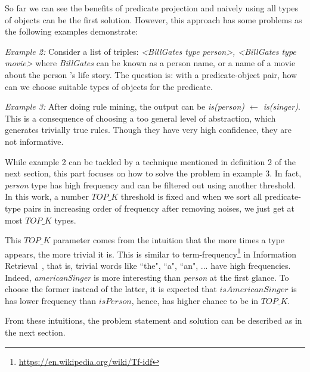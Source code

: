 \documentclass{acm_proc_article-sp}
\begin{document}

So far we can see the benefits of predicate projection and naively using all types of objects can be the first solution. However, this approach has some problems as the following examples demonstrate:

\textit{Example 2:} Consider a list of triples: \textit{<BillGates type person>, <BillGates type movie>} where \textit{BillGates} can be known as a person name, or a name of a movie about the person 's life story. The question is: with a predicate-object pair, how can we choose suitable types of objects for the predicate.

\textit{Example 3:} After doing rule mining, the output can be \textit{is(person) $\leftarrow$ is(singer)}. This is a consequence of choosing a too general level of abstraction, which generates trivially true rules. Though they have very high confidence, they are not informative.

While example 2 can be tackled by a technique mentioned in definition 2 of the next section, this part focuses on how to solve the problem in example 3. In fact, \textit{person} type has high frequency and can be filtered out using another threshold. In this work, a number $TOP\_K$ threshold is fixed and when we sort all predicate-type pairs in increasing order of frequency after removing noises, we just get at most $TOP\_K$ types.

This $TOP\_K$ parameter comes from the intuition that the more times a type appears, the more trivial it is. This is similar to term-frequency\footnote{\url{https://en.wikipedia.org/wiki/Tf-idf}} in Information Retrieval~\cite{ref2}, that is, trivial words like ``the", ``a", ``an", ... have high frequencies. Indeed, \textit{americanSinger} is more interesting than \textit{person} at the first glance. To choose the former instead of the latter, it is expected that $isAmericanSinger$ is has lower frequency than $isPerson$, hence, has higher chance to be in $TOP\_K$.

From these intuitions, the problem statement and solution can be described as in the next section.
\end{document}
